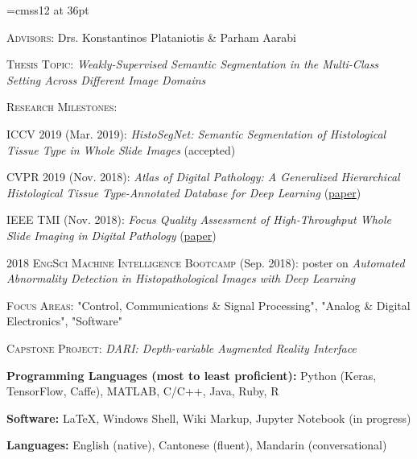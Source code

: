 \documentclass[12pt]{cv_style}
\begin{document}
\font\titlefont=cmss12 at 36pt


\flushleft{}
\begin{ditem}
	\item \textsc{Advisors:} Drs. Konstantinos Plataniotis \& Parham Aarabi
	\item \textsc{Thesis Topic:} \textit{Weakly-Supervised Semantic Segmentation in the Multi-Class Setting Across Different Image Domains}
	\item \textsc{Research Milestones:}
	\begin{ditem}
		\item \textsc{ICCV 2019} (Mar. 2019): \emph{HistoSegNet: Semantic Segmentation of Histological Tissue Type
in Whole Slide Images} (accepted)
		\item \textsc{CVPR 2019} (Nov. 2018): \emph{Atlas of Digital Pathology: A Generalized Hierarchical Histological Tissue Type-Annotated Database for Deep Learning} (\href{http://openaccess.thecvf.com/content_CVPR_2019/html/Hosseini_Atlas_of_Digital_Pathology_A_Generalized_Hierarchical_Histological_Tissue_Type-Annotated_CVPR_2019_paper.html}{paper})
		\item \textsc{IEEE TMI} (Nov. 2018): \emph{Focus Quality Assessment of High-Throughput Whole Slide Imaging in Digital Pathology} (\href{https://arxiv.org/abs/1811.06038}{paper})
		\item \textsc{2018 EngSci Machine Intelligence Bootcamp} (Sep. 2018): poster on \emph{Automated Abnormality Detection in Histopathological Images with Deep Learning}
	\end{ditem}
\end{ditem}
\medspace
{}
\begin{ditem}
	\item \textsc{Focus Areas:} "Control, Communications \& Signal Processing", "Analog \& Digital Electronics", "Software"
	\item \textsc{Capstone Project:} \textit{DARI: Depth-variable Augmented Reality Interface}	
\end{ditem}

\begin{ditem}
	\item \textbf{Programming Languages (most to least proficient):} Python (Keras, TensorFlow, Caffe), MATLAB, C/C++, Java, Ruby, R
	\item \textbf{Software:} \LaTeX, Windows Shell, Wiki Markup, Jupyter Notebook (in progress)
	\item \textbf{Languages:} English (native), Cantonese (fluent), Mandarin (conversational)
\end{ditem}
\end{document}
